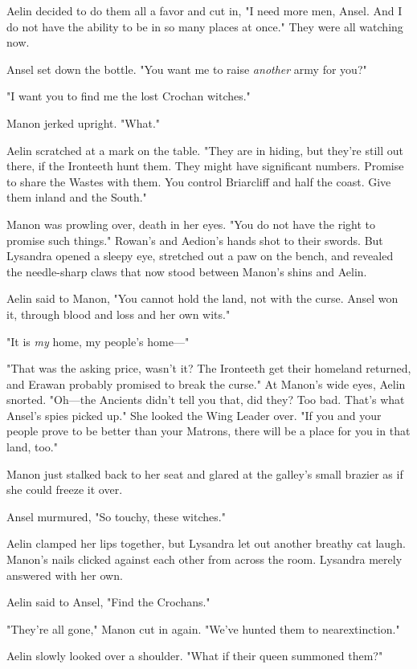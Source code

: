 Aelin decided to do them all a favor and cut in, "I need more men, Ansel. And I do not have the ability to be in so many places at once." They were all watching now.

Ansel set down the bottle. "You want me to raise \emph{another} army for you?"

"I want you to find me the lost Crochan witches."

Manon jerked upright. "What."

Aelin scratched at a mark on the table. "They are in hiding, but they're still out there, if the Ironteeth hunt them. They might have significant numbers. Promise to share the Wastes with them. You control Briarcliff and half the coast. Give them inland and the South."

Manon was prowling over, death in her eyes. "You do not have the right to promise such things." Rowan's and Aedion's hands shot to their swords. But Lysandra opened a sleepy eye, stretched out a paw on the bench, and revealed the needle-sharp claws that now stood between Manon's shins and Aelin.

Aelin said to Manon, "You cannot hold the land, not with the curse. Ansel won it, through blood and loss and her own wits."

"It is \emph{my} home, my people's home---"

"That was the asking price, wasn't it? The Ironteeth get their homeland returned, and Erawan probably promised to break the curse." At Manon's wide eyes, Aelin snorted. "Oh---the Ancients didn't tell you that, did they? Too bad. That's what Ansel's spies picked up." She looked the Wing Leader over. "If you and your people prove to be better than your Matrons, there will be a place for you in that land, too."

Manon just stalked back to her seat and glared at the galley's small brazier as if she could freeze it over.

Ansel murmured, "So touchy, these witches."

Aelin clamped her lips together, but Lysandra let out another breathy cat laugh. Manon's nails clicked against each other from across the room. Lysandra merely answered with her own.

Aelin said to Ansel, "Find the Crochans."

"They're all gone," Manon cut in again. "We've hunted them to nearextinction."

Aelin slowly looked over a shoulder. "What if their queen summoned them?"

